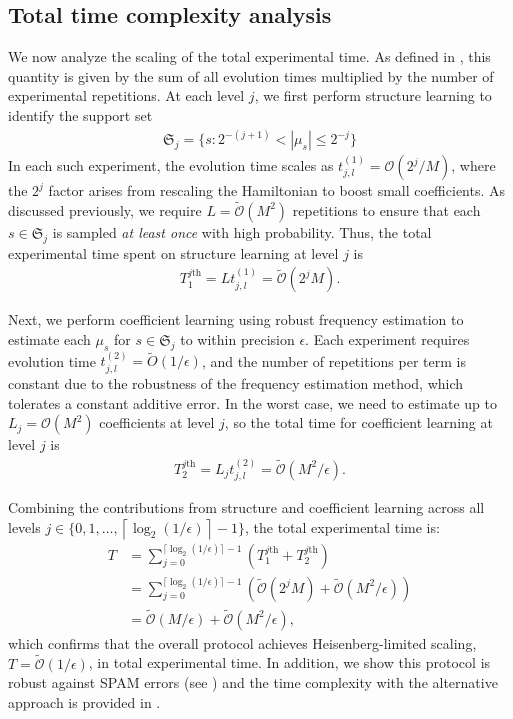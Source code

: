 \documentclass[twocolumn,superscriptaddress,aps,showpacs,amsmath,amstex,amssymb,citeautoscript,floatfix,pra,preprintnumbers]{revtex4-2}
\theoremstyle{plain}
\theoremstyle{plain}
\theoremstyle{plain}
\theoremstyle{plain}
\theoremstyle{plain}
\theoremstyle{plain}
\newcommand{\eqs}[1]{\begin{equation}\begin{split}#1\end{split}\end{equation}}
\begin{document}
\subsection{Total time complexity analysis\label{subsec:total_time_complexity}}

We now analyze the scaling of the total experimental time. As defined in , this quantity is given by the sum of all evolution times multiplied by the number of experimental repetitions. At each level $j$, we first perform structure learning to identify the support set
\eqs{
\mathfrak{S}_j=\{s:2^{-(j+1)}<|\mu_s|\leq 2^{-j}\}
}
In each such experiment, the evolution time scales as $t_{j,l}^{(1)}=\mathcal{O}(2^j/M)$, where the $2^j$ factor arises from rescaling the Hamiltonian to boost small coefficients. As discussed previously, we require $L=\widetilde{\mathcal{O}}(M^2)$ repetitions to ensure that each $s\in \mathfrak{S}_j$ is sampled \emph{at least once} with high probability. Thus, the total experimental time spent on structure learning at level $j$ is
\eqs{
T_{1}^{j\text{th}}=Lt_{j,l}^{(1)}=\widetilde{\mathcal{O}}(2^{j}M).
}

Next, we perform coefficient learning using robust frequency estimation to estimate each $\mu_s$ for $s\in \mathfrak{S}_j$ to within precision $\epsilon$. Each experiment requires evolution time $t^{(2)}_{j,l}=\widetilde{O}(1/\epsilon)$, and the number of repetitions per term is constant due to the robustness of the frequency estimation method, which tolerates a constant additive error. In the worst case, we need to estimate up to $L_j=\mathcal{O}(M^2)$ coefficients at level $j$, so the total time for coefficient learning at level $j$ is
\eqs{
T_2^{j\text{th}}=L_jt^{(2)}_{j,l}=\widetilde{\mathcal{O}}(M^2/\epsilon).
}

Combining the contributions from structure and coefficient learning across all levels $j\in\{0,1,\ldots,\left\lceil\log_2(1/\epsilon)\right\rceil-1\}$, the total experimental time is:
\eqs{
T&=\sum_{j=0}^{\lceil \log_{2}(1/\epsilon)\rceil-1}(T_1^{j\text{th}}+T_2^{j\text{th}})\\
&=\sum_{j=0}^{\lceil \log_{2}(1/\epsilon)\rceil-1}(\widetilde{\mathcal{O}}(2^j M)+\widetilde{\mathcal{O}}(M^2/\epsilon))\\
&=\widetilde{\mathcal{O}}(M/\epsilon)+\widetilde{\mathcal{O}}(M^{2}/\epsilon),
}
which confirms that the overall protocol achieves Heisenberg-limited scaling, $T = \widetilde{\mathcal{O}}(1/\epsilon)$, in total experimental time. In addition, we show this protocol is robust against SPAM errors (see ) and the time complexity with the alternative approach is provided in .
\end{document}
